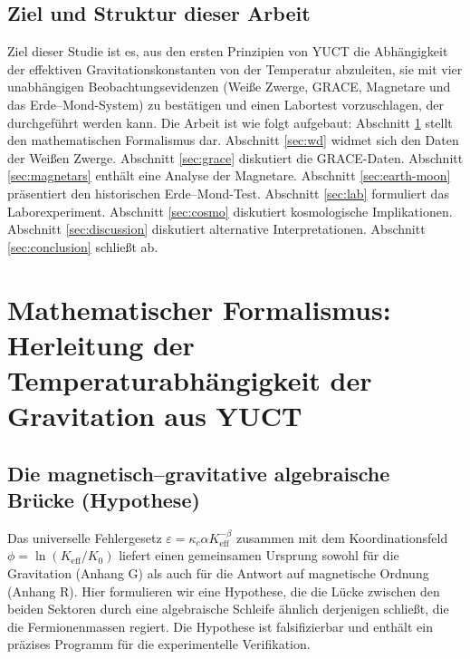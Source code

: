 \documentclass[12pt]{article}
\theoremstyle{remark}
\newcommand{\Keff}{K_{\mathrm{eff}}}
\newcommand{\kappac}{\kappa_c}
\begin{document}
	\subsection{Ziel und Struktur dieser Arbeit}
	\label{subsec:purpose}
	
	Ziel dieser Studie ist es, aus den ersten Prinzipien von YUCT die Abhängigkeit der effektiven Gravitationskonstanten von der Temperatur abzuleiten, sie mit vier unabhängigen Beobachtungsevidenzen (Weiße Zwerge, GRACE, Magnetare und das Erde–Mond-System) zu bestätigen und einen Labortest vorzuschlagen, der durchgeführt werden kann. Die Arbeit ist wie folgt aufgebaut: Abschnitt \ref{sec:math} stellt den mathematischen Formalismus dar. Abschnitt \ref{sec:wd} widmet sich den Daten der Weißen Zwerge. Abschnitt \ref{sec:grace} diskutiert die GRACE-Daten. Abschnitt \ref{sec:magnetars} enthält eine Analyse der Magnetare. Abschnitt \ref{sec:earth-moon} präsentiert den historischen Erde–Mond-Test. Abschnitt \ref{sec:lab} formuliert das Laborexperiment. Abschnitt \ref{sec:cosmo} diskutiert kosmologische Implikationen. Abschnitt \ref{sec:discussion} diskutiert alternative Interpretationen. Abschnitt \ref{sec:conclusion} schließt ab.
	
	\section{Mathematischer Formalismus: Herleitung der Temperaturabhängigkeit der Gravitation aus YUCT}
	\label{sec:math}
	
	\subsection{Die magnetisch–gravitative algebraische Brücke (Hypothese)}
	\label{subsec:magnetism-bridge}
	
	Das universelle Fehlergesetz $\varepsilon = \kappac \alpha \Keff^{-\beta}$ zusammen mit dem
	Koordinationsfeld $\phi = \ln(\Keff/K_0)$ liefert einen gemeinsamen Ursprung sowohl für die Gravitation
	(Anhang G) als auch für die Antwort auf magnetische Ordnung (Anhang R).  
	Hier formulieren wir eine Hypothese, die die Lücke zwischen den beiden Sektoren durch eine
	algebraische Schleife ähnlich derjenigen schließt, die die Fermionenmassen regiert.  
	Die Hypothese ist falsifizierbar und enthält ein präzises Programm für die experimentelle Verifikation.
	
\end{document}
